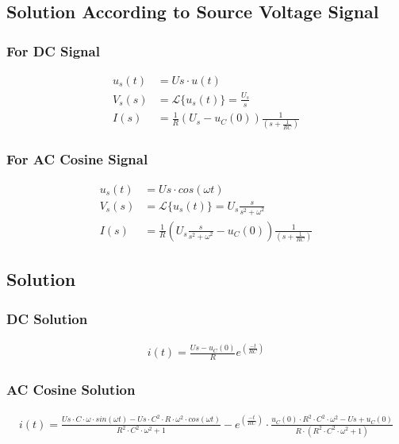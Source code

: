 \documentclass{article}
\begin{document}
\subsection{Solution According to Source Voltage Signal}
\subsubsection{For DC Signal}
\begin{align*}
    u_s(t) &= Us \cdot u(t)\\
    V_s(s) &= \mathcal{L} \big\{u_s(t)\big\} = \frac{U_s}{s}\\
    I(s) &= \frac{1}{R} (U_s - u_C(0))\frac{1}{(s+ \frac{1}{RC})}
\end{align*}
\subsubsection{For AC Cosine Signal}
\begin{align*}
    u_s(t) &= Us \cdot cos(\omega t)\\
    V_s(s) &= \mathcal{L} \big\{u_s(t)\big\} =U_s \frac{s}{s^2+\omega^2}\\
    I(s) &= \frac{1}{R} (U_s \frac{s}{s^2+\omega^2} - u_C(0))\frac{1}{(s+ \frac{1}{RC})}
\end{align*}
\subsection{Solution}
\subsubsection{DC Solution}
\begin{align*}
   i(t) = \frac{Us-u_C(0)}{R} e^(\frac{-t}{RC})
\end{align*}
\subsubsection{AC Cosine Solution}
\begin{align*}
   i(t) = \frac{Us\cdot C\cdot \omega \cdot sin(\omega t)-Us\cdot C^2\cdot R \cdot \omega^2 \cdot cos(\omega t)}{R^2\cdot C^2 \cdot \omega ^2 +1}-e^(\frac{-t}{RC})\cdot\frac{u_C(0)\cdot R^2\cdot C^2 \cdot \omega ^2-Us+u_C(0)}{R\cdot (R^2\cdot C^2 \cdot \omega ^2 +1)}
\end{align*}
\end{document}
